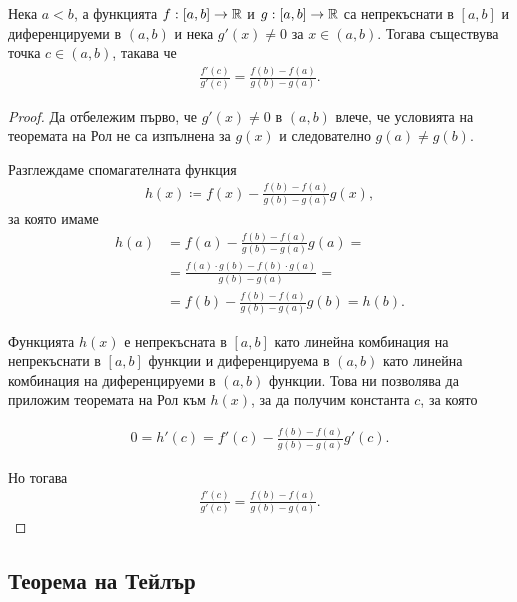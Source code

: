 \documentclass[numbers=endperiod, bibliography=totocnumbered]{scrartcl}
\begin{document}
\begin{theorem}
  Нека \( a < b \), а функцията \( f: [a, b] \to \mathbb{R} \) и \( g: [a, b] \to \mathbb{R} \) са непрекъснати в \( [a, b] \) и диференцируеми в \( (a, b) \) и нека \( g'(x) \neq 0 \) за \( x \in (a, b) \). Тогава съществува точка \( c \in (a, b) \), такава че
  \begin{align*}
    \frac {f'(c)} {g'(c)} = \frac {f(b) - f(a)} {g(b) - g(a)}.
  \end{align*}
\end{theorem}
\begin{proof}
  Да отбележим първо, че \( g'(x) \neq 0 \) в \( (a, b) \) влече, че условията на теоремата на Рол не са изпълнена за \( g(x) \) и следователно \( g(a) \neq g(b) \).

  Разглеждаме спомагателната функция
  \begin{align*}
    h(x) \coloneqq f(x) - \frac {f(b) - f(a)} {g(b) - g(a)} g(x),
  \end{align*}
  за която имаме
  \begin{align*}
    h(a)
    &=
    f(a) - \frac {f(b) - f(a)} {g(b) - g(a)} g(a)
    = \\ &=
    \frac {f(a) \cdot g(b) - f(b) \cdot g(a)} {g(b)-g(a)}
    = \\ &=
    f(b) - \frac {f(b) - f(a)} {g(b) - g(a)} g(b)
    =
    h(b).
  \end{align*}

  Функцията \( h(x) \) е непрекъсната в \( [a, b] \) като линейна комбинация на непрекъснати в \( [a, b] \) функции и диференцируема в \( (a, b) \) като линейна комбинация на диференцируеми в \( (a, b) \) функции. Това ни позволява да приложим теоремата на Рол към \( h(x) \), за да получим константа \( c \), за която

  \begin{align*}
    0 = h'(c) = f'(c) - \frac {f(b) - f(a)} {g(b) - g(a)} g'(c).
  \end{align*}

  Но тогава
  \begin{align*}
    \frac {f'(c)} {g'(c)} = \frac {f(b) - f(a)} {g(b) - g(a)}.
  \end{align*}
\end{proof}

\subsection{Теорема на Тейлър}
\end{document}
